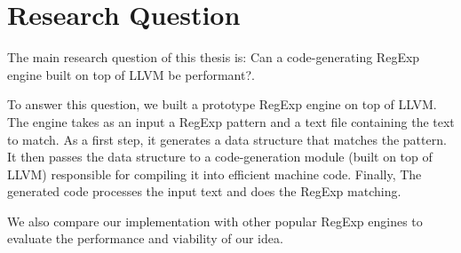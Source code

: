 \section{Research Question}\label{researchq}

The main research question of this thesis is: Can a code-generating RegExp engine built on top of LLVM be performant?.

To answer this question, we built a prototype RegExp engine on top of LLVM. The engine takes as an input a RegExp pattern and a text file containing the text to match. As a first step, it generates a data structure that matches the pattern. It then passes the data structure to a code-generation module (built on top of LLVM) responsible for compiling it into efficient machine code. Finally, The generated code processes the input text and does the RegExp matching.

We also compare our implementation with other popular RegExp engines to evaluate the performance and viability of our idea. 